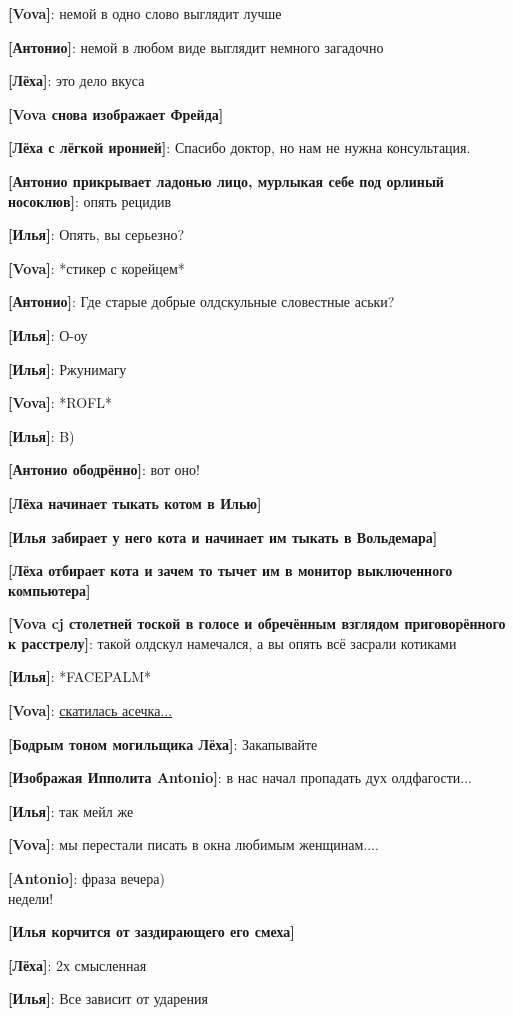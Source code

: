 \begin{flushleft}
\textbf{[Vova]}: немой в одно слово выглядит лучше

\textbf{[Антонио]}: немой в любом виде выглядит немного загадочно

\textbf{[Лёха]}: это дело вкуса

\textbf{[Vova снова изображает Фрейда]}

\textbf{[Лёха с лёгкой иронией]}: Спасибо доктор, но нам не нужна консультация.

\textbf{[Антонио прикрывает ладонью лицо, мурлыкая себе под орлиный носоклюв]}: опять рецидив

\textbf{[Илья]}: Опять, вы серьезно?

\textbf{[Vova]}: *стикер с корейцем*

\textbf{[Антонио]}: Где старые добрые олдскульные словестные аськи?

\textbf{[Илья]}: О-оу

\textbf{[Илья]}: Ржунимагу

\textbf{[Vova]}: *ROFL*

\textbf{[Илья]}: B)

\textbf{[Антонио ободрённо]}: вот оно!

\textbf{[Лёха начинает тыкать котом в Илью]}

\textbf{[Илья забирает у него кота и начинает им тыкать в Вольдемара]}

\textbf{[Лёха отбирает кота и зачем то тычет им в монитор выключенного компьютера]}

\textbf{[Vova cj столетней тоской в голосе и обречённым взглядом приговорённого к расстрелу]}: такой олдскул намечался, а вы опять всё засрали котиками

\textbf{[Илья]}: *FACEPALM*

\textbf{[Vova]}: \href{https://icq.com/windows/ru}{скатилась асечка...}

\textbf{[Бодрым тоном могильщика Лёха]}: Закапывайте

\textbf{[Изображая Ипполита Antonio]}: в нас начал пропадать дух олдфагости...

\textbf{[Илья]}: так мейл же

\textbf{[Vova]}: мы перестали писать в окна любимым женщинам....

\textbf{[Antonio]}: фраза вечера)\\
недели!

\textbf{[Илья корчится от заздирающего его смеха]}

\textbf{[Лёха]}: 2х смысленная

\textbf{[Илья]}: Все зависит от ударения


\end{flushleft}
